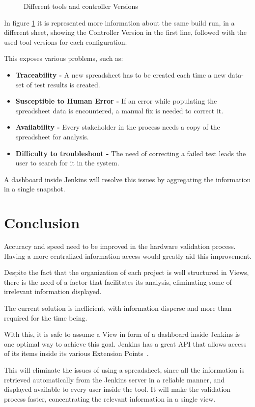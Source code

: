     \begin{figure}[H]
  \centering
      \caption{Different tools and controller Versions}
      \label{fig:excel2}
  \end{figure}

In figure \ref{fig:excel2} it is represented more information about the same build run, in a different sheet, showing the Controller Version in the first line, followed with the used tool versions for each configuration.

This exposes various problems, such as:

\begin{itemize}
\item \textbf{Traceability - } A new spreadsheet has to be created each time a new data-set of test results is created.
\item \textbf{Susceptible to Human Error - } If an error while populating the spreadsheet data is encountered, a manual fix is needed to correct it.
\item \textbf{Availability - } Every stakeholder in the process needs a copy of the spreadsheet for analysis.
\item \textbf{Difficulty to troubleshoot - } The need of correcting a failed test leads the user to search for it in the system.
\end{itemize}

A dashboard inside Jenkins will resolve this issues by aggregating the information in a single snapshot.

\section{Conclusion}\label{sec:conclusion_3}

Accuracy and speed need to be improved in the hardware validation process. Having a more centralized information access would greatly aid this improvement. 

Despite the fact that the organization of each project is well structured in Views, there is the need of a factor that facilitates its analysis, eliminating some of irrelevant information displayed.

The current solution is inefficient, with information disperse and more than required for the time being.

With this, it is safe to assume a View in form of a dashboard inside Jenkins is one optimal way to achieve this goal. Jenkins has a great API that allows access of its items inside its various Extension Points~\cite{jnks:extensionpoints}.

This will eliminate the issues of using a spreadsheet, since all the information is retrieved automatically from the Jenkins server in a reliable manner, and displayed available to every user inside the tool. It will make the validation process faster, concentrating the relevant information in a single view.